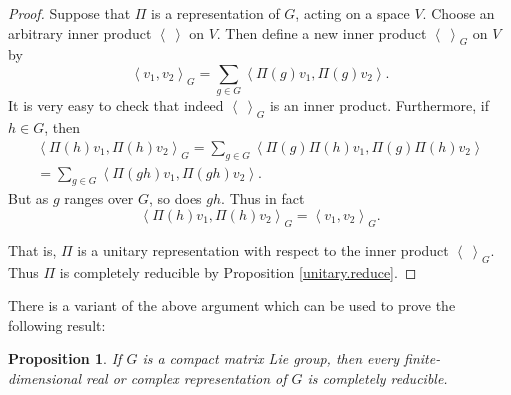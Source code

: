 \documentclass{amsbook}
\theoremstyle{plain}
\newtheorem{proposition}[theorem]{Proposition}
\numberwithin{equation}{chapter}
\numberwithin{theorem}{chapter}
\begin{document}
\begin{proof}
Suppose that $\Pi$ is a representation of $G$, acting on a space $V$. Choose
an arbitrary inner product $\left\langle \ \right\rangle $ on $V$. Then define
a new inner product $\left\langle \ \right\rangle _{G}$ on $V$ by
\[
\left\langle v_{1},v_{2}\right\rangle _{G}=\sum_{g\in G}\left\langle
\Pi(g)v_{1},\Pi(g)v_{2}\right\rangle \text{.}%
\]
It is very easy to check that indeed $\left\langle \ \right\rangle _{G}$ is an
inner product. Furthermore, if $h\in G$, then
\begin{align*}
\left\langle \Pi(h)v_{1},\Pi(h)v_{2}\right\rangle _{G}=\sum_{g\in
G}\left\langle \Pi(g)\Pi(h)v_{1},\Pi(g)\Pi(h)v_{2}\right\rangle \\
=\sum_{g\in G}\left\langle \Pi(gh)v_{1},\Pi(gh)v_{2}\right\rangle \text{.}%
\end{align*}
But as $g$ ranges over $G$, so does $gh$. Thus in fact
\[
\left\langle \Pi(h)v_{1},\Pi(h)v_{2}\right\rangle _{G}=\left\langle
v_{1},v_{2}\right\rangle _{G}\text{.}%
\]

That is, $\Pi$ is a unitary representation with respect to the inner product
$\left\langle \ \right\rangle _{G}$. Thus $\Pi$ is completely reducible by
Proposition \ref{unitary.reduce}.
\end{proof}

There is a variant of the above argument which can be used to prove the
following result:

\begin{proposition}
\label{compact.reduce}If $G$ is a compact matrix Lie group, then every
finite-dimensional real or complex representation of $G$ is completely reducible.
\end{proposition}
\end{document}
